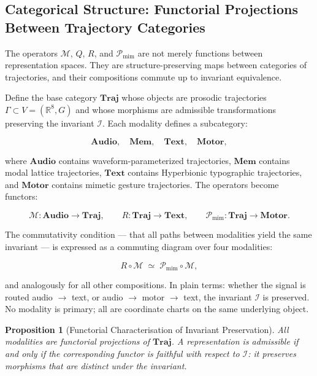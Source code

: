 \documentclass[12pt, a4paper]{article}
\newtheorem{proposition}{Proposition}
\begin{document}
\subsection{Categorical Structure: Functorial Projections Between Trajectory Categories}

The operators $\mathcal{M}$, $Q$, $R$, and $\mathcal{P}_{\mathrm{mim}}$ are not merely functions between representation spaces. They are structure-preserving maps between categories of trajectories, and their compositions commute up to invariant equivalence.

Define the base category $\mathbf{Traj}$ whose objects are prosodic trajectories $\Gamma \subset V = (\mathbb{R}^8, G)$ and whose morphisms are admissible transformations preserving the invariant $\mathcal{I}$. Each modality defines a subcategory:

\begin{equation}
\mathbf{Audio},\quad \mathbf{Mem},\quad \mathbf{Text},\quad \mathbf{Motor},
\label{eq:categories}
\end{equation}

where $\mathbf{Audio}$ contains waveform-parameterized trajectories, $\mathbf{Mem}$ contains modal lattice trajectories, $\mathbf{Text}$ contains Hyperbionic typographic trajectories, and $\mathbf{Motor}$ contains mimetic gesture trajectories. The operators become functors:

\begin{equation}
\mathcal{M} : \mathbf{Audio} \to \mathbf{Traj},\qquad
R : \mathbf{Traj} \to \mathbf{Text},\qquad
\mathcal{P}_{\mathrm{mim}} : \mathbf{Traj} \to \mathbf{Motor}.
\label{eq:functors}
\end{equation}

The commutativity condition --- that all paths between modalities yield the same invariant --- is expressed as a commuting diagram over four modalities:

\begin{equation}
R \circ \mathcal{M} \;\simeq\; \mathcal{P}_{\mathrm{mim}} \circ \mathcal{M},
\label{eq:commute}
\end{equation}

and analogously for all other compositions. In plain terms: whether the signal is routed audio $\to$ text, or audio $\to$ motor $\to$ text, the invariant $\mathcal{I}$ is preserved. No modality is primary; all are coordinate charts on the same underlying object.

\begin{proposition}[Functorial Characterisation of Invariant Preservation]
All modalities are functorial projections of $\mathbf{Traj}$. A representation is admissible if and only if the corresponding functor is faithful with respect to $\mathcal{I}$: it preserves morphisms that are distinct under the invariant.
\end{proposition}
\end{document}
